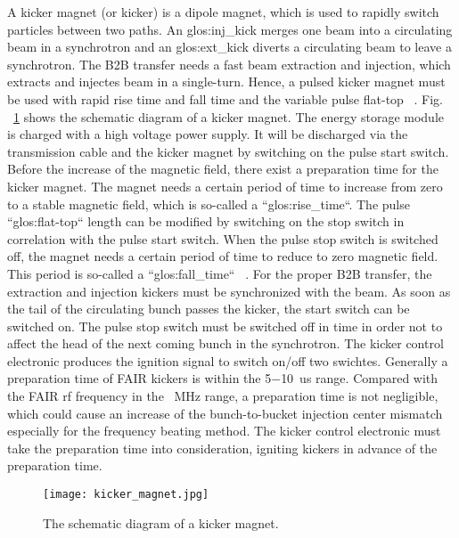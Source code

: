 A kicker magnet (or kicker) is a dipole magnet, which is used to rapidly switch particles between two paths. An \gls{glos:inj_kick} merges one beam into a circulating beam in a synchrotron and an \gls{glos:ext_kick} diverts a circulating beam to leave a synchrotron. The B2B transfer needs a fast beam extraction and injection, which extracts and injectes beam in a single-turn. Hence, a pulsed kicker magnet must be used with rapid rise time and fall time and the variable pulse flat-top ~\cite{petzenhauser_concept_2016}. Fig. ~\ref{kicker_magnet} shows the schematic diagram of a kicker magnet. The energy storage module%
 is charged with a high voltage power supply. It will be discharged via the transmission cable and the kicker magnet by switching on the pulse start switch. Before the increase of the magnetic field, there exist a preparation time for the kicker magnet. The magnet needs a certain period of time to increase from zero to a stable magnetic field, which is so-called a ``\gls{glos:rise_time}``. The pulse ``\gls{glos:flat-top}`` length can be modified by switching on the stop switch in correlation with the pulse start switch. When the pulse stop switch is switched off, the magnet needs a certain period of time to reduce to zero magnetic field. This period is so-called a ``\gls{glos:fall_time}`` ~\cite{udo_injection_2014}. For the proper B2B transfer, the extraction and injection kickers must be synchronized with the beam. As soon as the tail of the circulating bunch passes the kicker, the start switch can be switched on. The pulse stop switch must be switched off in time in order not to affect the head of the next coming bunch in the synchrotron. The kicker control electronic produces the ignition signal to switch on/off two swichtes. Generally a preparation time of FAIR kickers is within the \SI{5}{}$-$\SI{10}{us} range. Compared with the FAIR rf frequency in the \SI{}{MHz} range, a preparation time is not negligible, which could cause an increase of the bunch-to-bucket injection center mismatch especially for the frequency beating method. The kicker control electronic must take the preparation time into consideration, igniting kickers in advance of the preparation time.
\begin{figure}[!htb]
   \centering   
   \texttt{[image: kicker\_magnet.jpg]}
   \caption{The schematic diagram of a kicker magnet.}
   \label{kicker_magnet}
\end{figure}
 
